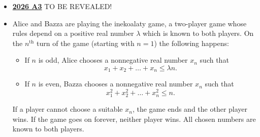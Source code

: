 \documentclass[11pt]{scrartcl}
\begin{document}
 \begin{itemize}[leftmargin=*]

\item \href{https://www.imo-official.org/assets/documents/problems/2026/IMO2026SL.pdf}{\textbf{2026 A3}} TO BE REVEALED!

\item {} Alice and Bazza are playing the inekoalaty game, a two-player game whose rules depend on a positive real number $\lambda$ which is known to both players. On the $n^\text{th}$ turn of the game (starting with $n=1$) the following happens:
\begin{itemize}[leftmargin=*]
\item[$\bullet$] If $n$ is odd, Alice chooses a nonnegative real number $x_n$ such that
\[
    x_1 + x_2 + \dots + x_n \leqslant \lambda n.
  \]
\item[$\bullet$] If $n$ is even, Bazza chooses a nonnegative real number $x_n$ such that
\[
    x_1^2 + x_2^2 + \dots + x_n^2 \leqslant n.
  \]
\end{itemize}
If a player cannot choose a suitable $x_n$, the game ends and the other player wins. If the game goes on forever, neither player wins. All chosen numbers are known to both players.


\end{itemize}
\end{document}
